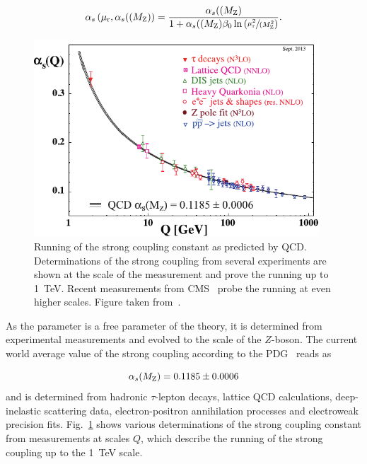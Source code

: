 \begin{equation*}
   \alpha_{s}\left(\mu_{\mathrm{r}}, \alpha_{s}((M_\mathrm{Z})\right) = \frac{\alpha_{s}((M_\mathrm{Z})}{1 + \alpha_{s}((M_\mathrm{Z})\beta_0 \ln
       \left( \sfrac{\mu_{\mathrm{r}}^2}{(M_\mathrm{Z}^2} \right)}.
\end{equation*}

\begin{figure}[htb] 
    \centering
    \includegraphics[width=0.95\textwidth]{figures/sm_model/as_running.pdf}\hfill
    \caption[Running of the strong coupling]{Running of the strong coupling
        constant as predicted by QCD. Determinations of the strong coupling from
        several experiments are shown at the scale of the measurement and prove
        the running up to \SI{1}{\TeV}. Recent measurements from
        CMS~\cite{Khachatryan:2014waa,CMS:2014mna} probe the running at even
        higher scales. Figure taken from~\cite{Agashe:2014kda}.} 
    \label{fig:as_running} 
\end{figure}


As the parameter \as is a free parameter of the theory, it is determined from
experimental measurements and evolved to the scale of the $Z$-boson. The current
world average value of the strong coupling according to the
PDG~\cite{Agashe:2014kda} reads as

\begin{equation*}
    \alpha_{s}(M_\mathrm{Z}) = 0.1185 \pm 0.0006
\end{equation*}
%
and is determined from hadronic $\tau$-lepton decays, lattice QCD calculations,
deep-inelastic scattering data, electron-positron annihilation processes and
electroweak precision fits. Fig.~\ref{fig:as_running} shows various
determinations of the strong coupling constant from measurements at scales $Q$,
which describe the running of the strong coupling up to the \SI{1}{\TeV} scale.


